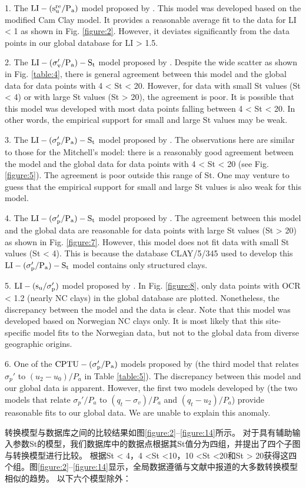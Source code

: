 \begin{Parallel}{0.60\textwidth}{}
{        1. The $\rm{LI}-(s_u^{re}/P_a)$ model proposed by \citet{Wroth1978137}. This model was developed based on the modified Cam Clay model. It provides a reasonable average fit to the data for LI < 1 as shown in Fig. \ref{figure:2}. However, it deviates significantly from the data points in our global database for LI > 1.5.

        2. The $\rm{LI}-(\sigma_v'/P_a)-S_t$ model proposed by \citet{Mitchell1993}. Despite the wide scatter as shown in Fig. \ref{table:4}, there is general agreement between this model and the global data for data points with 4 < St < 20. However, for data with small St values (St < 4) or with large St values (St > 20), the agreement is poor. It is possible that this model was developed with most data points falling between 4 < St < 20. In other words, the empirical support for small and large St values may be weak.

        3. The $\rm{LI}-(\sigma_p'/P_a)-S_t$ model proposed by \citet{NAVFAC1982}. The observations here are similar to those for the Mitchell’s model: there is a reasonably good agreement between the model and the global data for data points with 4 < St < 20 (see Fig. \ref{figure:5}). The agreement is poor outside this range of St. One may venture to guess that the empirical support for small and large St values is also weak for this model.

        4. The $\rm{LI}-(\sigma_p'/P_a)-S_t$ model proposed by \citet{Ching2012522}. The agreement between this model and the global data are reasonable for data points with large St values (St > 20) as shown in Fig. \ref{figure:7}. However, this model does not fit data with small St values (St < 4). This is because the database CLAY/5/345 used to develop this $\rm{LI}-(\sigma_p'/P_a)-S_t$ model contains only structured clays.

        5. $\rm{LI}-(s_u/\sigma_p')$ model proposed by \citet{Bjerrum1960711}. In Fig. \ref{figure:8}, only data points with OCR < 1.2 (nearly NC clays) in the global database are plotted. Nonetheless, the discrepancy between the model and the data is clear. Note that this model was developed based on Norwegian NC clays only. It is most likely that this site-specific model fits to the Norwegian data, but not to the global data from diverse geographic origins.
        
        6. One of the $\rm{CPTU}-(\sigma_p'/P_a)$ models proposed by \citet{Chen1996488} (the third model that relates $\sigma_p'$ to $(u_2-u_0)/P_a$ in Table \ref{table:5}). The discrepancy between this model and our global data is apparent. However, the first two models developed by \citet{Chen1996488} (the two models that relate $\sigma_p'/P_a$ to $(q_t-\sigma_v)/P_a$ and $(q_t-u_2)/P_a$) provide reasonable fits to our global data. We are unable to explain this anomaly.
    }
    \ParallelRText
    {
        转换模型与数据库之间的比较结果如图\ref{figure:2}–\ref{figure:14}所示。 对于具有辅助输入参数St的模型，我们数据库中的数据点根据其St值分为四组，并提出了四个子图与转换模型进行比较。 根据St < 4，4 <St <10，10 <St <20和St > 20获得这四个组。图\ref{figure:2}–\ref{figure:14}显示，全局数据遵循与文献中报道的大多数转换模型相似的趋势。 以下六个模型除外：

}
\end{Parallel}
